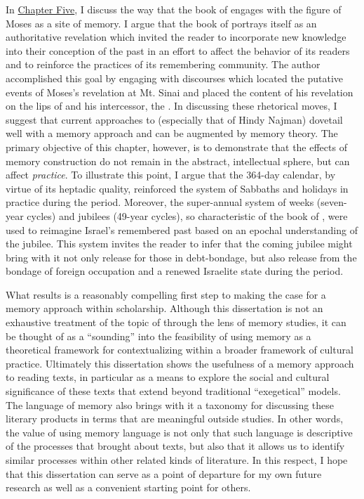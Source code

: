 In \hyperref[chap:jubilees]{Chapter Five}, I discuss the way that the book of \jub engages with the figure of Moses as a site of memory. I argue that the book of \jub portrays itself as an authoritative revelation which invited the reader to incorporate new knowledge into their conception of the past in an effort to affect the behavior of its readers and to reinforce the practices of its remembering community. The author accomplished this goal by engaging with \psgraphical discourses which located the putative events of Moses's revelation at Mt. Sinai and placed the content of his revelation on the lips of \yahweh and his intercessor, the \ap. In discussing these rhetorical moves, I suggest that current approaches to \jub (especially that of Hindy Najman) dovetail well with a memory approach and can be augmented by memory theory. The primary objective of this chapter, however, is to demonstrate that the effects of memory construction do not remain in the abstract, intellectual sphere, but can affect \emph{practice}. To illustrate this point, I argue that the 364-day calendar, by virtue of its heptadic quality, reinforced the system of Sabbaths and holidays in practice during the \secondtemple period. Moreover, the super-annual system of weeks (seven-year cycles) and jubilees (49-year cycles), so characteristic of the book of \jub, were used to reimagine Israel's remembered past based on an epochal understanding of the jubilee. This system invites the reader to infer that the coming jubilee might bring with it not only release for those in debt-bondage, but also release from the bondage of foreign occupation and a renewed Israelite state during the \secondtemple period.

What results is a reasonably compelling first step to making the case for a memory approach within \rwb scholarship. Although this dissertation is not an exhaustive treatment of the topic of \rwb through the lens of memory studies, it can be thought of as a ``sounding'' into the feasibility of using memory as a theoretical framework for contextualizing \rwb within a broader framework of cultural practice. Ultimately this dissertation shows the usefulness of a memory approach to reading \rwb texts, in particular as a means to explore the social and cultural significance of these texts that extend beyond traditional ``exegetical'' models. The language of memory also brings with it a taxonomy for discussing these literary products in terms that are meaningful outside \secondtemple studies. In other words, the value of using memory language is not only that such language is descriptive of the processes that brought about \rwb texts, but also that it allows us to identify similar processes within other related kinds of literature. In this respect, I hope that this dissertation can serve as a point of departure for my own future research as well as a convenient starting point for others. 